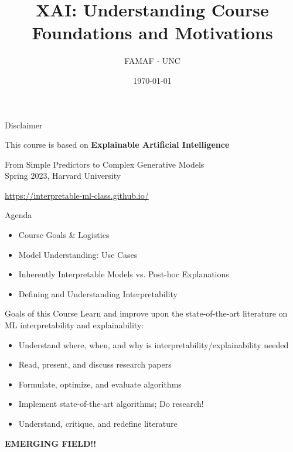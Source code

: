 \documentclass[10pt,aspectratio=169]{beamer}
\title{\emoji{wtf} XAI: Understanding Course Foundations and Motivations}
\author{FAMAF - UNC}
\date{\today}
\begin{document}
\begin{frame}
\titlepage
\end{frame}

\begin{frame}{Disclaimer}
\begin{block}{This course is based on}
\textbf{Explainable Artificial Intelligence}

From Simple Predictors to Complex Generative Models\\
Spring 2023, Harvard University

\url{https://interpretable-ml-class.github.io/}
\end{block}
\end{frame}

\begin{frame}{Agenda}
\begin{itemize}
\item Course Goals \& Logistics
\item Model Understanding: Use Cases
\item Inherently Interpretable Models vs. Post-hoc Explanations
\item Defining and Understanding Interpretability
\end{itemize}
\end{frame}

\begin{frame}{Goals of this Course}
Learn and improve upon the state-of-the-art literature on ML interpretability and explainability:

\begin{itemize}
\item Understand where, when, and why is interpretability/explainability needed
\item Read, present, and discuss research papers
\item Formulate, optimize, and evaluate algorithms
\item Implement state-of-the-art algorithms; Do research!
\item Understand, critique, and redefine literature
\end{itemize}

\vspace{0.5cm}
\centering
\textbf{\Large EMERGING FIELD!!}
\end{frame}
\end{document}
